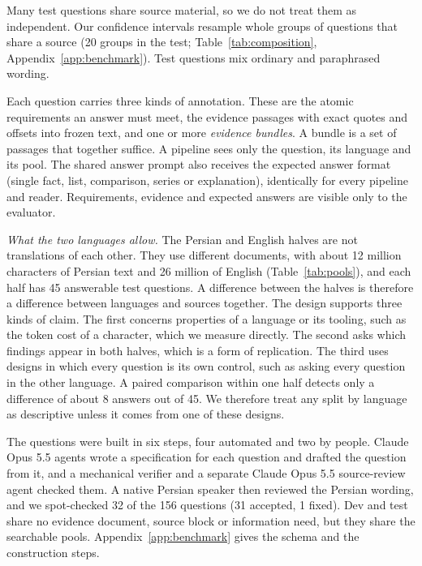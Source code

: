 Many test questions share source material, so we do not treat them as independent. Our confidence intervals resample whole groups of questions that share a source (20 groups in the test; Table~\ref{tab:composition}, Appendix~\ref{app:benchmark}). Test questions mix ordinary and paraphrased wording.

Each question carries three kinds of annotation. These are the atomic requirements an answer must meet, the evidence passages with exact quotes and offsets into frozen text, and one or more \emph{evidence bundles}. A bundle is a set of passages that together suffice. A pipeline sees only the question, its language and its pool. The shared answer prompt also receives the expected answer format (single fact, list, comparison, series or explanation), identically for every pipeline and reader. Requirements, evidence and expected answers are visible only to the evaluator.

\emph{What the two languages allow.} The Persian and English halves are not translations of each other. They use different documents, with about 12 million characters of Persian text and 26 million of English (Table~\ref{tab:pools}), and each half has 45 answerable test questions. A difference between the halves is therefore a difference between languages and sources together. The design supports three kinds of claim. The first concerns properties of a language or its tooling, such as the token cost of a character, which we measure directly. The second asks which findings appear in both halves, which is a form of replication. The third uses designs in which every question is its own control, such as asking every question in the other language. A paired comparison within one half detects only a difference of about 8 answers out of 45. We therefore treat any split by language as descriptive unless it comes from one of these designs.

The questions were built in six steps, four automated and two by people. Claude Opus 5.5 agents wrote a specification for each question and drafted the question from it, and a mechanical verifier and a separate Claude Opus 5.5 source-review agent checked them. A native Persian speaker then reviewed the Persian wording, and we spot-checked 32 of the 156 questions (31 accepted, 1 fixed). Dev and test share no evidence document, source block or information need, but they share the searchable pools. Appendix~\ref{app:benchmark} gives the schema and the construction steps.

